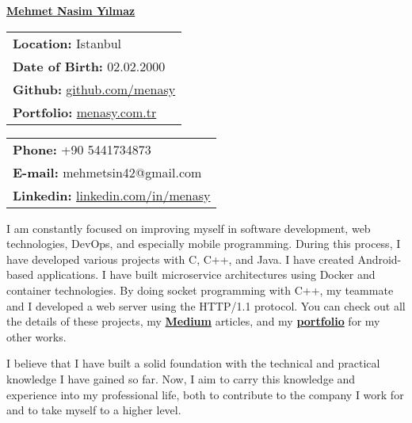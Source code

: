\documentclass[a4paper,11pt]{article}
\begin{document}
\vspace*{-6.5em} 
\begin{center}
    \href{https://menasy.com.tr/}{\LARGE \textbf{Mehmet Nasim Yılmaz}}
\end{center}
\vspace*{0.4em} 
\noindent
\begin{minipage}[t]{0.48\textwidth}
    \begin{tabular}{@{}l}
        \textbf{Location:} Istanbul \\
        \textbf{Date of Birth:} 02.02.2000 \\
        \textbf{Github:} \href{https://github.com/menasy}{github.com/menasy} \\
        \textbf{Portfolio:} \href{https://menasy.com.tr/}{menasy.com.tr} \\
    \end{tabular}
\end{minipage}%
\hfill
\begin{minipage}[t]{0.48\textwidth}
    \raggedleft
    \begin{tabular}{@{}l}
        \textbf{Phone:} +90 5441734873 \\
        \textbf{E-mail:} mehmetsin42@gmail.com \\
        \textbf{Linkedin:} \href{https://linkedin.com/in/menasy}{linkedin.com/in/menasy} \\
    \end{tabular}
\end{minipage}

\vspace{0.7em}

I am constantly focused on improving myself in software development, web technologies, DevOps, and especially mobile programming. During this process, I have developed various projects with C, C++, and Java. I have created Android-based applications. I have built microservice architectures using Docker and container technologies. By doing socket programming with C++, my teammate and I developed a web server using the HTTP/1.1 protocol. You can check out all the details of these projects, my \textbf{\href{https://medium.com/@menasy}{Medium}} articles, and my \textbf{\href{https://menasy.com.tr/}{portfolio}} for my other works.
\vspace{-0.6em}

I believe that I have built a solid foundation with the technical and practical knowledge I have gained so far. Now, I aim to carry this knowledge and experience into my professional life, both to contribute to the company I work for and to take myself to a higher level.
\vspace{-0.6em}
\end{document}
